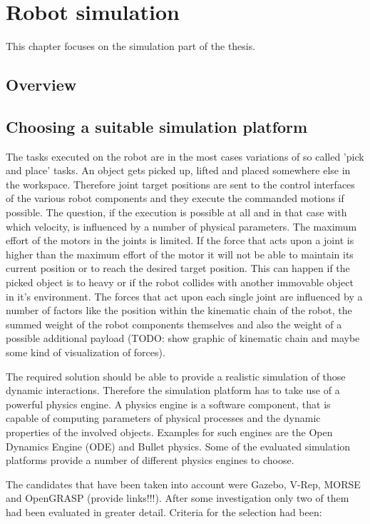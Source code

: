 
\chapter{Robot simulation}
\label{chap:simulation}
This chapter focuses on the simulation part of the thesis.

\section{Overview}

\section{Choosing a suitable simulation platform}
The tasks executed on the robot are in the most cases variations of so called 'pick and place' tasks. An object gets picked up, lifted and placed somewhere else in the workspace. Therefore joint target positions are sent to the control interfaces of the various robot components and they execute the commanded motions if possible. The question, if the execution is possible at all and in that case with which velocity, is influenced by a number of physical parameters. The maximum effort of the motors in the joints is limited. If the force that acts upon a joint is higher than the maximum effort of the motor it will not be able to maintain its current position or to reach the desired target position. This can happen if the picked object is to heavy or if the robot collides with another immovable object in it's environment. The forces that act upon each single joint are influenced by a number of factors like the position within the kinematic chain of the robot, the summed weight of the robot components themselves and also the weight of a possible additional payload (TODO: show graphic of kinematic chain and maybe some kind of visualization of forces).

The required solution should be able to provide a realistic simulation of those dynamic interactions. Therefore the simulation platform has to take use of a powerful physics engine. A physics engine is a software component, that is capable of computing parameters of physical processes and the dynamic properties of the involved objects. Examples for such engines are the Open Dynamics Engine (ODE) and Bullet physics. Some of the evaluated simulation platforms provide a number of different physics engines to choose.

The candidates that have been taken into account were Gazebo, V-Rep, MORSE and OpenGRASP (provide links!!!). After some investigation only two of them had been evaluated in greater detail. Criteria for the selection had been:

